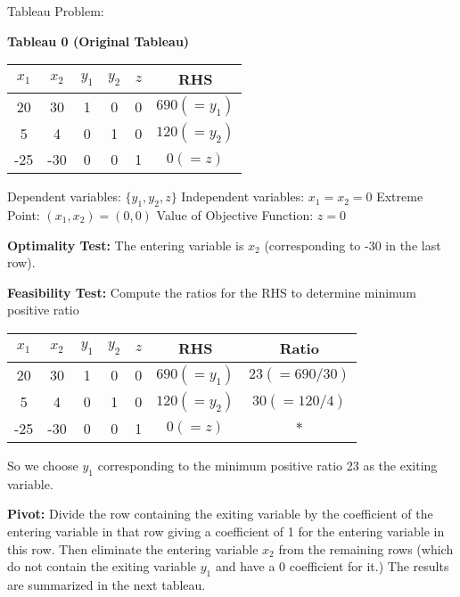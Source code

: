 \begin{example} Tableau Problem:\newline

\textbf{Tableau 0 (Original Tableau)}\newline

\begin{center}
\begin{tabular}{|c c c c c | c|}
\hline
$x_1$ & $x_2$ & $y_1$ & $y_2$ & $z$ & RHS \\ \hline
20 & 30 & 1 & 0 & 0 & $690 (= y_1)$ \\
5 & 4 & 0 & 1 & 0 & $120 (=y_2)$ \\ \hline
-25 & -30 & 0 & 0 & 1 & $0(=z)$ \\ \hline
\end{tabular}\newline
\end{center}

Dependent variables: $\{y_1,y_2,z\}$ \newline
Independent variables: $x_1=x_2=0$\newline
Extreme Point: $(x_1,x_2) = (0,0)$\newline
Value of Objective Function: $z=0$\newline

\textbf{Optimality Test:} The entering variable is $x_2$ (corresponding to -30 in the last row).\newline

\textbf{Feasibility Test:}	Compute the ratios for the RHS to determine minimum positive ratio\newline

\begin{center}
\begin{tabular}{| c c c c c | c | c |}
\hline
$x_1$ & $x_2$ & $y_1$ & $y_2$ & $z$ & RHS & Ratio \\ \hline
20 & 30 & 1 & 0 & 0 & $690 (= y_1)$ & $23 (=690/30)$ \\
5 & 4 & 0 & 1 & 0 & $120 (=y_2)$ & $30 (=120/4)$\\ \hline
-25 & -30 & 0 & 0 & 1 & $0(=z)$ & $*$\\ \hline
\end{tabular}\newline
\end{center}

So we choose $y_1$ corresponding to the minimum positive ratio 23 as the exiting variable.\newline

\textbf{Pivot:} Divide the row containing the exiting variable by the coefficient of the entering variable in that row giving a coefficient of 1 for the entering variable in this row. Then eliminate the entering variable $x_2$ from the remaining rows (which do not contain the exiting variable $y_1$ and have a 0 coefficient for it.) The results are summarized in the next tableau.\newline



\end{example}
